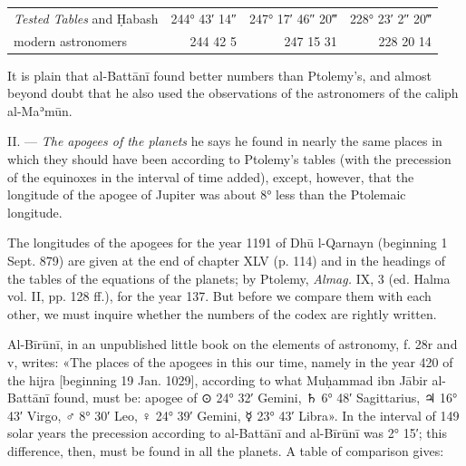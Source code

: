 \documentclass[11pt]{article}
\begin{document}
\begin{center}\small\begin{tabular}{lrrr}
\emph{Tested Tables} and Ḥabash\footnotemark{} & 244° 43′ 14″ & 247° 17′ 46″ 20‴ & 228° 23′ 2″ 20‴ \\
modern astronomers & 244 42 5 & 247 15 31 & 228 20 14 \\
\end{tabular}\end{center}
\addtocounter{footnote}{-1}
\par It is plain that al-Battānī found better numbers than Ptolemy's, and almost beyond doubt that he also used the observations of the astronomers of the caliph al-Maʾmūn.\par
\par II. — \emph{The apogees of the planets} he says he found in nearly the same places in which they should have been according to Ptolemy's tables (with the precession of the equinoxes in the interval of time added), except, however, that the longitude of the apogee of Jupiter was about 8° less than the Ptolemaic longitude.\par
\par The longitudes of the apogees for the year 1191 of Dhū l-Qarnayn (beginning 1 Sept. 879) are given at the end of chapter XLV (p. 114) and in the headings of the tables of the equations of the planets; by Ptolemy, \emph{Almag.} IX, 3 (ed. Halma vol. II, pp. 128 ff.), for the year 137. But before we compare them with each other, we must inquire whether the numbers of the codex are rightly written.\par
\par Al-Bīrūnī, in an unpublished little book on the elements of astronomy, f. 28r and v, writes: «The places of the apogees in this our time, namely in the year 420 of the hijra [beginning 19 Jan. 1029], according to what Muḥammad ibn Jābir al-Battānī found, must be: apogee of {\MoonFont\upshape ⊙} 24° 32′ Gemini, {\MoonFont\upshape ♄} 6° 48′ Sagittarius, {\MoonFont\upshape ♃} 16° 43′ Virgo, {\MoonFont\upshape ♂} 8° 30′ Leo, {\MoonFont\upshape ♀} 24° 39′ Gemini, {\MoonFont\upshape ☿} 23° 43′ Libra». In the interval of 149 solar years the precession according to al-Battānī and al-Bīrūnī was 2° 15′; this difference, then, must be found in all the planets. A table of comparison gives:\par
\end{document}
